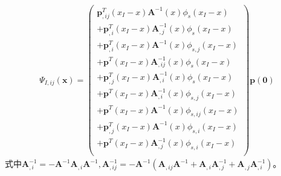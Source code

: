 \begin{equation}
\begin{split}
    \Psi_{I,ij}(\pmb{x})=\left(\begin{matrix}
    \pmb p_{,ij}^{T}(x_I-x)\pmb A^{-1}(x)\phi_s(x_I-x)\\
    +\pmb p_{,i}^{T}(x_I-x)\pmb A_{,j}^{-1}(x)\phi_s(x_I-x)\\
    +\pmb p_{,i}^{T}(x_I-x)\pmb A^{-1}(x)\phi_{s,j}(x_I-x)\\
    +\pmb p^{T}(x_I-x)\pmb A_{,ij}^{-1}(x)\phi_s(x_I-x)\\
    +\pmb p_{,j}^{T}(x_I-x)\pmb A_{,i}^{-1}(x)\phi_s(x_I-x)\\
    +\pmb p^{T}(x_I-x)\pmb A_{,i}^{-1}(x)\phi_{s,j}(x_I-x)\\
    +\pmb p^{T}(x_I-x)\pmb A^{-1}(x)\phi_{s,ij}(x_I-x)\\
    +\pmb p_{,j}^{T}(x_I-x)\pmb A^{-1}(x)\phi_{s,i}(x_I-x)\\
    +\pmb p^{T}(x_I-x)\pmb A_{,j}^{-1}(x)\phi_{s,i}(x_I-x)\\
    \end{matrix}\right)
    \pmb p(\pmb 0)
\end{split}
\end{equation}
式中$\pmb A_{,i}^{-1}=-\pmb A^{-1}\pmb A_{,i}\pmb A^{-1},\pmb A_{,ij}^{-1}=-\pmb A^{-1}(\pmb A_{,ij}\pmb A^{-1}+\pmb A_{,i}\pmb A_{,j}^{-1}+\pmb A_{,j}\pmb A_{,i}^{-1})$。\par
